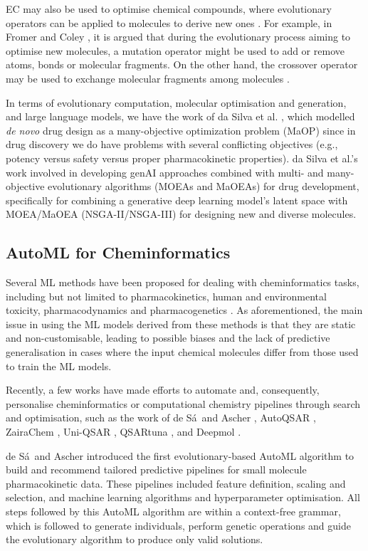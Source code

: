 EC may also be used to optimise chemical compounds, where evolutionary operators can be applied to molecules to derive new ones \cite{Fromer2023}. For example, in Fromer and Coley \cite{Fromer2023}, it is argued that during the evolutionary process aiming to optimise new molecules, a mutation operator might be used to add or remove atoms, bonds or molecular fragments. On the other hand, the crossover operator may be used to exchange molecular fragments among molecules \cite{Fromer2023}. 

In terms of evolutionary computation, molecular optimisation and generation, and large language models, we have the work of da Silva et al. \cite{daSilva2024}, which modelled \emph{de novo} drug design as a many-objective optimization problem (MaOP) since in drug discovery we do have problems with several conflicting objectives (e.g., potency versus safety versus proper pharmacokinetic properties). da Silva et al.'s work involved in developing genAI approaches combined with multi- and many-objective evolutionary algorithms (MOEAs and MaOEAs) for drug development, specifically for combining a generative deep learning model’s latent space with MOEA/MaOEA (NSGA-II/NSGA-III) for designing new and diverse molecules.


\subsection{AutoML for Cheminformatics}

Several ML methods have been proposed for dealing with cheminformatics tasks, including but not limited to pharmacokinetics, human and environmental toxicity, pharmacodynamics and pharmacogenetics \cite{Pires2015, Daina2017, Dong2018, Xiong2021, Cheng2012, Yang2019, deSa2022, Wei2022, Myung2024, Gu2024, Fu2024}. As aforementioned, the main issue in using the ML models derived from these methods is that they are static and non-customisable, leading to possible biases and the lack of predictive generalisation in cases where the input chemical molecules differ from those used to train the ML models. 

Recently, a few works have made efforts to automate and, consequently, personalise cheminformatics or computational chemistry pipelines through search and optimisation, such as the work of de S\'a\ and Ascher \cite{deSa2024}, AutoQSAR \cite{Dixon2016},  ZairaChem \cite{Turon2023}, Uni-QSAR \cite{Gao2023}, QSARtuna \cite{Mervin2024}, and Deepmol \cite{Correia2024}.

de S\'a\ and Ascher \cite{deSa2024} introduced the first evolutionary-based AutoML algorithm to build and recommend tailored predictive pipelines for small molecule pharmacokinetic data. These pipelines included feature definition, scaling and selection, and machine learning algorithms and hyperparameter optimisation. All steps followed by this AutoML algorithm are within a context-free grammar, which is followed to generate individuals, perform genetic operations and guide the evolutionary algorithm to produce only valid solutions. 

